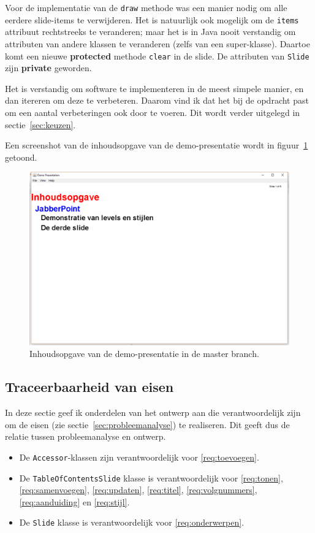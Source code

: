 \documentclass[a4paper]{article}
\newcommand{\reqref}[1]{\ref{req:#1}}
\newcommand{\code}[1]{\lstinline[columns=fixed]{#1}}
\begin{document}
    Voor de implementatie van de \code{draw} methode was een manier nodig om alle eerdere slide-items te verwijderen.
    Het is natuurlijk ook mogelijk om de \code{items} attribuut rechtstreeks te veranderen;
    maar het is in Java nooit verstandig om attributen van andere klassen te veranderen (zelfs van een super-klasse).
    Daartoe komt een nieuwe \textbf{protected} methode \code{clear} in de slide.
    De attributen van \code{Slide} zijn \textbf{private} geworden.

    Het is verstandig om software te implementeren in de meest simpele manier, en dan itereren om deze te verbeteren.
    Daarom vind ik dat het bij de opdracht past om een aantal verbeteringen ook door te voeren.
    Dit wordt verder uitgelegd in sectie~\ref{sec:keuzen}.

    Een screenshot van de inhoudsopgave van de demo-presentatie wordt in figuur~\ref{fig:master} getoond.
    \begin{figure}[!htb]
     \caption{
        Inhoudsopgave van de demo-presentatie in de master branch.\label{fig:master}
     }
     \centering \includegraphics[width=\textwidth]{Screenshots/master.png}
    \end{figure}

    \subsection{Traceerbaarheid van eisen}
        In deze sectie geef ik onderdelen van het ontwerp aan die verantwoordelijk zijn om de eisen (zie sectie~\ref{sec:probleemanalyse}) te realiseren.
        Dit geeft dus de relatie tussen probleemanalyse en ontwerp.

        \begin{itemize}
            \item De \code{Accessor}-klassen zijn verantwoordelijk voor \reqref{toevoegen}.
            \item De \code{TableOfContentsSlide} klasse is verantwoordelijk voor \reqref{tonen}, \reqref{samenvoegen},
                \reqref{updaten}, \reqref{titel}, \reqref{volgnummers}, \reqref{aanduiding} en \reqref{stijl}.
            \item De \code{Slide} klasse is verantwoordelijk voor \reqref{onderwerpen}.
        \end{itemize}
\end{document}
